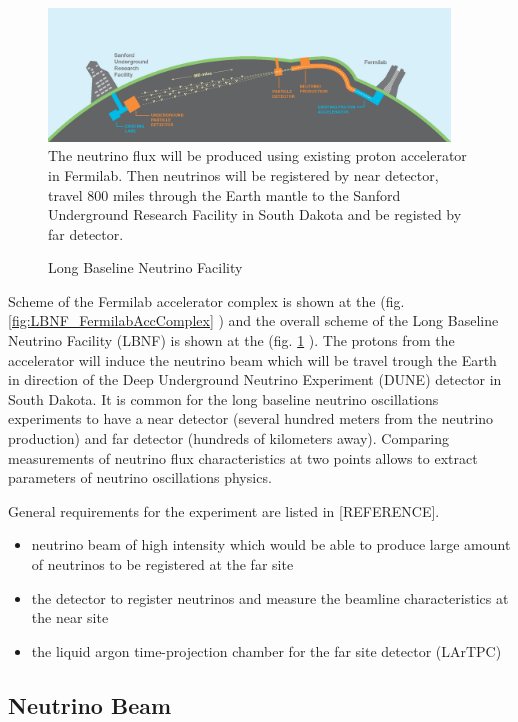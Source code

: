 \begin{figure}
\caption{Long Baseline Neutrino Facility}
\label{fig:LBNF_overallScheme}
\centering
\includegraphics[width=0.95\textwidth, keepaspectratio=true]{figs/LBNF_overallScheme.png}
\\The neutrino flux will be produced using existing proton accelerator in Fermilab. Then neutrinos will be registered by near detector, travel 800 miles through the Earth mantle to the Sanford Underground Research Facility in South Dakota and be registed by far detector. \cite{ref_LBNFweb}   
\end{figure}

Scheme of the Fermilab accelerator complex is shown at the (fig. \ref{fig:LBNF_FermilabAccComplex} ) and the overall scheme of the 
Long Baseline Neutrino Facility (LBNF) is shown at the (fig. \ref{fig:LBNF_overallScheme} ). The protons from the accelerator  will induce the neutrino beam which will be travel trough the Earth in direction of the Deep Underground Neutrino Experiment (DUNE) detector in South Dakota. It is common for the long baseline neutrino oscillations experiments to have a near detector (several hundred meters from the neutrino production) and far detector (hundreds of kilometers away). Comparing measurements of neutrino flux characteristics at two points allows to extract parameters of neutrino oscillations physics.

General requirements for the experiment are listed in [REFERENCE].
\begin{itemize}
  \item neutrino beam of high intensity which would be able to produce large amount of neutrinos to be registered at the far site
  \item the detector to register neutrinos and measure the beamline characteristics at the near site
  \item the liquid argon time-projection chamber for the far site detector (LArTPC)
\end{itemize}

\subsection{Neutrino Beam}

